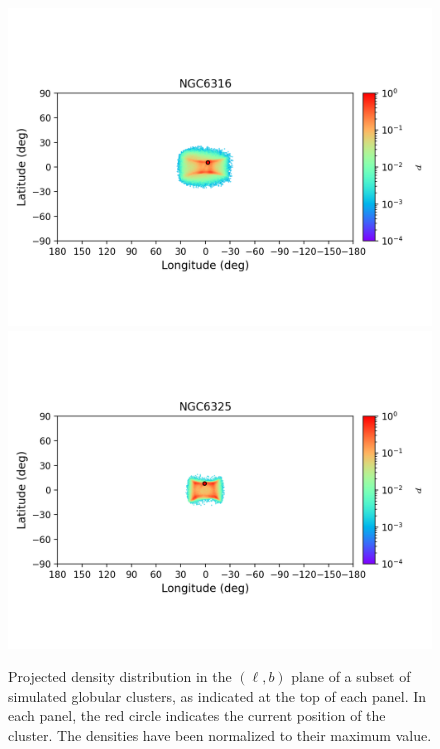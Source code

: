 \begin{figure}
\begin{center}
                \includegraphics[clip=true, trim = 0mm 20mm 0mm 10mm, width=1\columnwidth]{images/error_plots_NGC6316.png}
                \includegraphics[clip=true, trim = 0mm 20mm 0mm 10mm, width=1\columnwidth]{images/error_plots_NGC6325.png}
            \end{center}
            \caption[]{Projected density distribution in the $(\ell, b)$ plane of a subset of simulated globular clusters, as indicated at the top of each panel. In each panel, the red circle indicates the current position of the cluster. The densities have been normalized to their maximum value.}\label{stream9}
        \end{figure}

